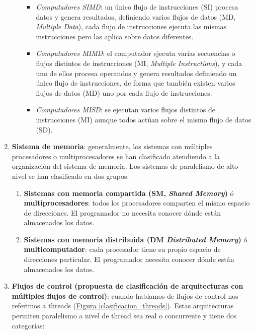 \documentclass[10pt,a4paper,spanish]{report}
\begin{document}
\begin{enumerate}[\color{azul}{\bf $\heartsuit$}]
\begin{enumerate}[$\longrightarrow$]
\begin{itemize}
\item \textit{\textcolor[rgb]{0.2,0.4,0.8}{Computadores SIMD}}: un único flujo de instrucciones (SI) procesa datos y genera resultados, definiendo varios flujos de datos (MD, \textit{\textcolor[rgb]{0.2,0.4,0.8}{Multiple Data}}), cada flujo de instrucciones ejecuta las mismas instrucciones pero las aplica sobre datos diferentes.
\item \textit{\textcolor[rgb]{0.2,0.4,0.8}{Computadores MIMD}}: el computador ejecuta varias secuencias o flujos distintos de instrucciones (MI, \textit{\textcolor[rgb]{0.2,0.4,0.8}{Multiple Instructions}}), y cada uno de ellos procesa operandos y genera resultados definiendo un único flujo de instrucciones, de forma que también existen varios flujos de datos (MD) uno por cada flujo de instrucciones.
\item \textit{\textcolor[rgb]{0.2,0.4,0.8}{Computadores MISD}}: se ejecutan varios flujos distintos de instrucciones (MI) aunque todos actúan sobre el mismo flujo de datos (SD).
\end{itemize}
\end{enumerate}
\item \textbf{\textcolor[rgb]{0.2,0.4,0.8}{Sistema de memoria}}: generalmente, los sistemas con múltiples procesadores o multiprocesadores se han clasificado atendiendo a la organización del sistema de memoria. Los sistemas de paralelismo de alto nivel se han clasificado en dos grupos:
\begin{enumerate}[$\longrightarrow$]
  \item \textbf{\textcolor[rgb]{0.2,0.4,0.8}{Sistemas con memoria compartida (SM, \textit{Shared Memory})}} ó \textbf{\textcolor[rgb]{0.2,0.4,0.8}{multiprocesadores}}: todos los procesadores comparten el mismo espacio de direcciones. El programador no necesita conocer dónde están almacenados los datos.
  \item \textbf{\textcolor[rgb]{0.2,0.4,0.8}{Sistemas con memoria distribuida (DM \textit{Distributed Memory})}} ó \textbf{\textcolor[rgb]{0.2,0.4,0.8}{multicomputador}}: cada procesador tiene su propio espacio de direcciones particular. El programador necesita conocer dónde están almacenados los datos.
\end{enumerate}
\item \textbf{\textcolor[rgb]{0.2,0.4,0.8}{Flujos de control (propuesta de clasificación de arquitecturas con múltiples flujos de control)}}: cuando hablamos de flujos de control nos referimos a threads (\hyperref[clasificacion_threads]{Figura \ref*{clasificacion_threads}}). Estas arquitecturas permiten paralelismo a nivel de thread sea real o concurrente y tiene dos categorías:

\end{enumerate}
\end{document}
